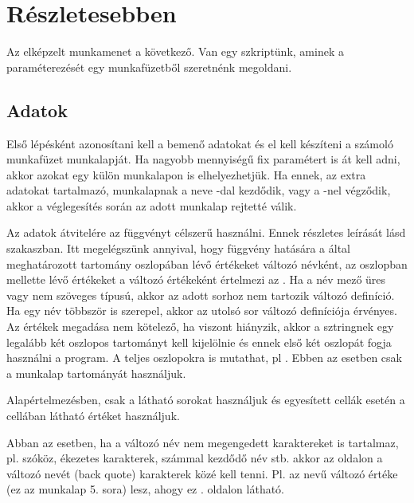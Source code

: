 
\chapter{Részletesebben}
\label{chap:2}

Az elképzelt munkamenet a következő. Van egy  szkriptünk,
aminek a paraméterezését egy  munkafüzetből szeretnénk
megoldani.

\section{Adatok}
\label{sec:2.1}

Első lépésként azonosítani kell a bemenő adatokat és el kell
készíteni a számoló munkafüzet  munkalapját. Ha nagyobb
mennyiségű fix paramétert is át kell adni, akkor azokat egy külön 
munkalapon is elhelyezhetjük. 
Ha ennek, az extra adatokat
tartalmazó, munkalapnak a 
neve -dal kezdődik, vagy a -nel végződik,
akkor a véglegesítés során az adott 
munkalap rejtetté válik.

Az adatok átvitelére az  függvényt célszerű
használni. Ennek részletes leírását lásd 
 szakaszban. Itt megelégszünk annyival, hogy 
függvény hatására a  által meghatározott tartomány
 oszlopában lévő értékeket változó névként, az 
oszlopban mellette lévő értékeket a változó értékeként értelmezi 
az . Ha a név mező üres vagy nem szöveges típusú, akkor az
adott sorhoz nem tartozik 
változó definíció. Ha egy név többször is szerepel, akkor az utolsó sor
változó definíciója 
érvényes. Az  értékek megadása nem kötelező, ha viszont
hiányzik, akkor a  sztringnek egy legalább két
oszlopos tartományt kell kijelölnie és ennek első két oszlopát fogja
használni a program. A  teljes oszlopokra is
mutathat, pl . Ebben 
az esetben csak a munkalap  tartományát használjuk.

Alapértelmezésben, csak a látható sorokat használjuk és egyesített
cellák esetén a cellában 
látható értéket használjuk.

Abban az esetben, ha a változó név nem megengedett karaktereket is
tartalmaz, pl. szóköz, ékezetes karakterek, számmal kezdődő név
stb. akkor az  oldalon a változó nevét  
(back quote) karakterek közé kell tenni. Pl. az 
nevű változó értéke (ez az 
 munkalap 5. sora)  lesz, ahogy ez
. %
oldalon látható.

